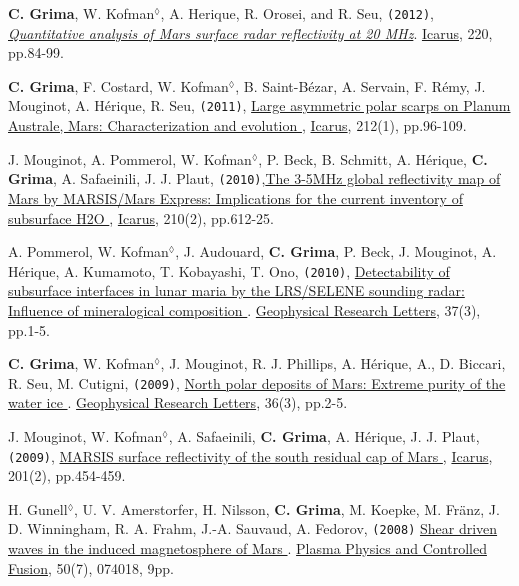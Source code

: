 \begin{etaremune}
\item
  \textbf{C. Grima}, W. Kofman$^\lozenge$, A. Herique, R. Orosei, and R. Seu, \texttt{(2012)}, \href{http://www.sciencedirect.com/science/article/pii/S0019103512001558}{\emph{Quantitative analysis of Mars surface radar reflectivity at 20 MHz}}. \ul{Icarus}, 220, pp.84-99.
  
\item
  \textbf{C. Grima}, F. Costard, W. Kofman$^\lozenge$, B. Saint-Bézar, A. Servain, F. Rémy, J. Mouginot, A. Hérique, R. Seu, \texttt{(2011)}, \href{http://www.sciencedirect.com/science/article/pii/S0019103510004859}{Large asymmetric polar scarps on Planum Australe, Mars: Characterization and evolution \aiOpenAccessSquare}, \ul{Icarus}, 212(1), pp.96-109.

\item
  J. Mouginot, A. Pommerol, W. Kofman$^\lozenge$, P. Beck, B. Schmitt, A. Hérique, \textbf{C. Grima}, A. Safaeinili, J. J. Plaut, \texttt{(2010)},\href{https://www.sciencedirect.com/science/article/pii/S0019103510002757}{The 3-5MHz global reflectivity map of Mars by MARSIS/Mars Express: Implications for the current inventory of subsurface H2O  \aiOpenAccessSquare}, \ul{Icarus}, 210(2), pp.612-25.

\item
  A. Pommerol, W. Kofman$^\lozenge$, J. Audouard, \textbf{C. Grima}, P. Beck, J. Mouginot, A. Hérique,  A. Kumamoto, T. Kobayashi, T. Ono, \texttt{(2010)}, \href{http://onlinelibrary.wiley.com/doi/10.1029/2009GL041681/abstract}{Detectability of subsurface interfaces in lunar maria by the LRS/SELENE sounding radar: Influence of mineralogical composition  \aiOpenAccessSquare}. \ul{Geophysical Research Letters}, 37(3), pp.1-5.
  
\item
  \textbf{C. Grima}, W. Kofman$^\lozenge$, J. Mouginot, R. J. Phillips, A. Hérique, A., D. Biccari, R. Seu, M. Cutigni, \texttt{(2009)}, \href{http://onlinelibrary.wiley.com/doi/10.1029/2008GL036326/abstract}{North polar deposits of Mars: Extreme purity of the water ice \aiOpenAccessSquare}. \ul{Geophysical Research Letters}, 36(3), pp.2-5.
  
\item
  J. Mouginot, W. Kofman$^\lozenge$, A. Safaeinili, \textbf{C. Grima}, A. Hérique, J. J. Plaut, \texttt{(2009)}, \href{http://www.sciencedirect.com/science/article/pii/S0019103509000311}{MARSIS surface reflectivity of the south residual cap of Mars \aiOpenAccessSquare}, \ul{Icarus}, 201(2), pp.454-459.
  
\item
  H. Gunell$^\lozenge$, U. V. Amerstorfer, H. Nilsson, \textbf{C. Grima}, M. Koepke, M. Fränz, J. D. Winningham, R. A. Frahm, J.-A. Sauvaud, A. Fedorov, \texttt{(2008)} \href{http://iopscience.iop.org/0741-3335/50/7/074018}{Shear driven waves in the induced magnetosphere of Mars \aiOpenAccessSquare}. \ul{Plasma Physics and Controlled Fusion}, 50(7), 074018, 9pp.

\end{etaremune}
